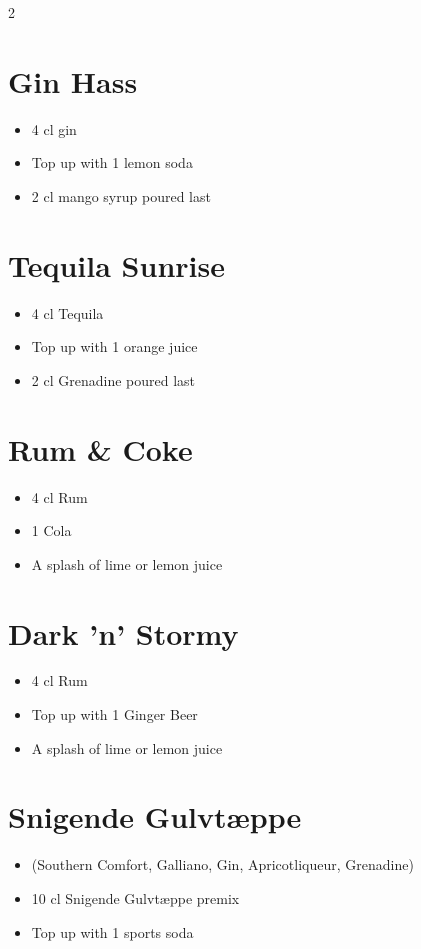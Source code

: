 \documentclass[a4paper,12pt]{article}
\begin{document}
\begin{multicols}{2}
\section*{Gin Hass}
\begin{itemize}
    \item 4 cl gin
    \item Top up with 1 lemon soda
    \item 2 cl mango syrup poured last
\end{itemize}

\section*{Tequila Sunrise}
\begin{itemize}
    \item 4 cl Tequila
    \item Top up with 1 orange juice
    \item 2 cl Grenadine poured last
\end{itemize}

\section*{Rum \& Coke}
\begin{itemize}
    \item 4 cl Rum
    \item 1 Cola
    \item A splash of lime or lemon juice
\end{itemize}

\section*{Dark 'n' Stormy}
\begin{itemize}
    \item 4 cl Rum
    \item Top up with 1 Ginger Beer
    \item A splash of lime or lemon juice
\end{itemize}

\section*{Snigende Gulvtæppe}
\begin{itemize}
    \item (Southern Comfort, Galliano, Gin, Apricotliqueur, Grenadine)
    \item 10 cl Snigende Gulvtæppe premix
    \item Top up with 1 sports soda
\end{itemize}


\end{multicols}
\end{document}
